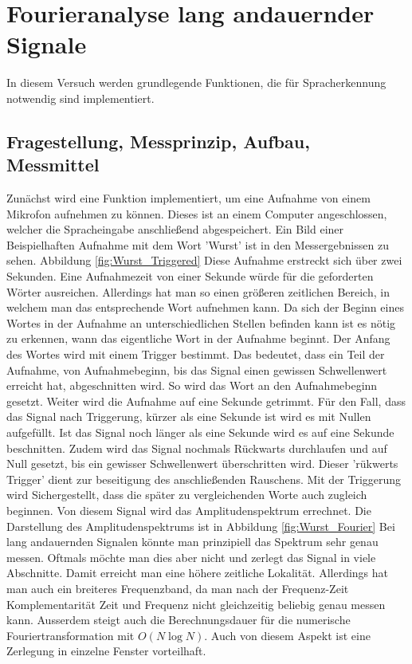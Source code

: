 %
%
\chapter{Fourieranalyse lang andauernder Signale}
\label{chap:VERSUCH_1}
In diesem Versuch werden grundlegende Funktionen, die für Spracherkennung notwendig sind implementiert.
\section{Fragestellung, Messprinzip, Aufbau, Messmittel}
\label{chap:VERSUCH_1_FRAGESTELLUNG}
Zunächst wird eine Funktion implementiert, um eine Aufnahme von einem Mikrofon aufnehmen zu können. Dieses ist an einem Computer angeschlossen, welcher die Spracheingabe anschließend abgespeichert.
Ein Bild einer Beispielhaften Aufnahme mit dem Wort 'Wurst' ist in den Messergebnissen zu sehen. Abbildung \ref{fig:Wurst_Triggered}
Diese Aufnahme erstreckt sich über zwei Sekunden. Eine Aufnahmezeit von einer Sekunde würde für die geforderten Wörter ausreichen. Allerdings hat man so einen größeren zeitlichen Bereich, in welchem man das entsprechende Wort aufnehmen kann.
Da sich der Beginn eines Wortes in der Aufnahme an unterschiedlichen Stellen befinden kann ist es nötig zu erkennen, wann das eigentliche Wort in der Aufnahme beginnt. Der Anfang des Wortes wird mit einem Trigger bestimmt. Das bedeutet, dass ein Teil der Aufnahme, von Aufnahmebeginn, bis das Signal einen gewissen Schwellenwert erreicht hat, abgeschnitten wird. So wird das Wort an den Aufnahmebeginn gesetzt. Weiter wird die Aufnahme auf eine Sekunde getrimmt. Für den Fall, dass das Signal nach Triggerung, kürzer als eine Sekunde ist wird es mit Nullen aufgefüllt.
Ist das Signal noch länger als eine Sekunde wird es auf eine Sekunde beschnitten. Zudem wird das Signal nochmals Rückwarts durchlaufen und auf Null gesetzt, bis ein gewisser Schwellenwert überschritten wird.
Dieser 'rükwerts Trigger' dient zur beseitigung des anschließenden Rauschens.
Mit der Triggerung wird Sichergestellt, dass die später zu vergleichenden Worte auch zugleich beginnen.
Von diesem Signal wird das Amplitudenspektrum errechnet. Die Darstellung des Amplitudenspektrums ist in Abbildung \ref{fig:Wurst_Fourier}
Bei lang andauernden Signalen könnte man prinzipiell das Spektrum sehr genau messen. Oftmals möchte man dies aber nicht und zerlegt das Signal in viele Abschnitte. Damit erreicht man eine höhere zeitliche Lokalität. Allerdings hat man auch ein breiteres Frequenzband, da man nach der Frequenz-Zeit Komplementarität Zeit und Frequenz nicht gleichzeitig beliebig genau messen kann. \cite[S.7]{Franz2015c} Ausserdem steigt auch die Berechnungsdauer für die numerische Fouriertransformation mit $O(N \log N)$. Auch von diesem Aspekt ist eine Zerlegung in einzelne Fenster vorteilhaft. \cite[S.16]{Franz2015c}
